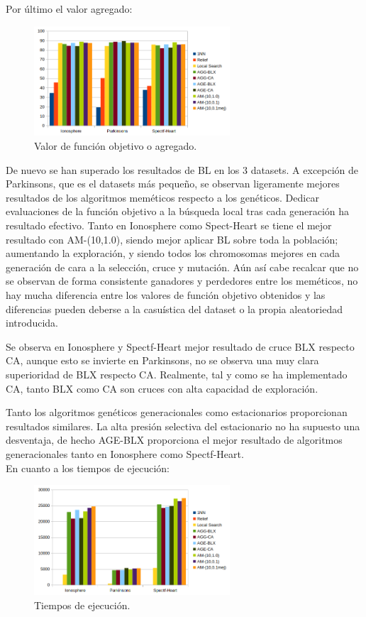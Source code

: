 \documentclass[11pt,a4paper]{article}
\theoremstyle{definition}
\begin{document}
	Por último el valor agregado:
	
	\begin{figure}[H]
		\centering
		\includegraphics[width=0.65\textwidth]{images/agr.png}
		\caption{Valor de función objetivo o agregado.}
	\end{figure}
	
	De nuevo se han superado los resultados de BL en los 3 datasets. A excepción de Parkinsons, que es el datasets más pequeño, se observan ligeramente mejores resultados de los algoritmos meméticos respecto a los genéticos. Dedicar evaluaciones de la función objetivo a la búsqueda local tras cada generación ha resultado efectivo. Tanto en Ionosphere como Spect-Heart se tiene el mejor resultado con AM-(10,1.0), siendo mejor aplicar BL sobre toda la población; aumentando la exploración, y siendo todos los chromosomas mejores en cada generación de cara a la selección, cruce y mutación. Aún así cabe recalcar que no se observan de forma consistente ganadores y perdedores entre los meméticos, no hay mucha diferencia entre los valores de función objetivo obtenidos y las diferencias pueden deberse a la casuística del dataset o la propia aleatoriedad introducida. 
	
	Se observa en Ionosphere y Spectf-Heart mejor resultado de cruce BLX respecto CA, aunque esto se invierte en Parkinsons, no se observa una muy clara superioridad de BLX respecto CA. Realmente, tal y como se ha implementado CA, tanto BLX como CA son cruces con alta capacidad de exploración.
	
	Tanto los algoritmos genéticos generacionales como estacionarios proporcionan resultados similares. La alta presión selectiva del estacionario no ha supuesto una desventaja, de hecho AGE-BLX proporciona el mejor resultado de algoritmos generacionales tanto en Ionosphere como Spectf-Heart.~\\
	
	En cuanto a los tiempos de ejecución:
	
	
	\begin{figure}[H]
		\centering
		\includegraphics[width=0.65\textwidth]{images/time.png}
		\caption{Tiempos de ejecución.}
	\end{figure}
	
\end{document}
